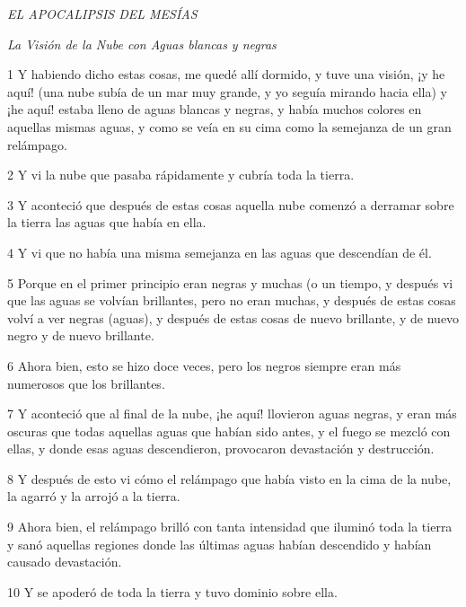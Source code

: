 \par \textit{EL APOCALIPSIS DEL MESÍAS}

\par \textit{La Visión de la Nube con Aguas blancas y negras}


\par 1 Y habiendo dicho estas cosas, me quedé allí dormido, y tuve una visión, ¡y he aquí! (una nube subía de un mar muy grande, y yo seguía mirando hacia ella) y ¡he aquí! estaba lleno de aguas blancas y negras, y había muchos colores en aquellas mismas aguas, y como se veía en su cima como la semejanza de un gran relámpago.

\par 2 Y vi la nube que pasaba rápidamente y cubría toda la tierra.

\par 3 Y aconteció que después de estas cosas aquella nube comenzó a derramar sobre la tierra las aguas que había en ella.

\par 4 Y vi que no había una misma semejanza en las aguas que descendían de él.

\par 5 Porque en el primer principio eran negras y muchas (o un tiempo, y después vi que las aguas se volvían brillantes, pero no eran muchas, y después de estas cosas volví a ver negras (aguas), y después de estas cosas de nuevo brillante, y de nuevo negro y de nuevo brillante.

\par 6 Ahora bien, esto se hizo doce veces, pero los negros siempre eran más numerosos que los brillantes.

\par 7 Y aconteció que al final de la nube, ¡he aquí! llovieron aguas negras, y eran más oscuras que todas aquellas aguas que habían sido antes, y el fuego se mezcló con ellas, y donde esas aguas descendieron, provocaron devastación y destrucción.

\par 8 Y después de esto vi cómo el relámpago que había visto en la cima de la nube, la agarró y la arrojó a la tierra.

\par 9 Ahora bien, el relámpago brilló con tanta intensidad que iluminó toda la tierra y sanó aquellas regiones donde las últimas aguas habían descendido y habían causado devastación.

\par 10 Y se apoderó de toda la tierra y tuvo dominio sobre ella.


